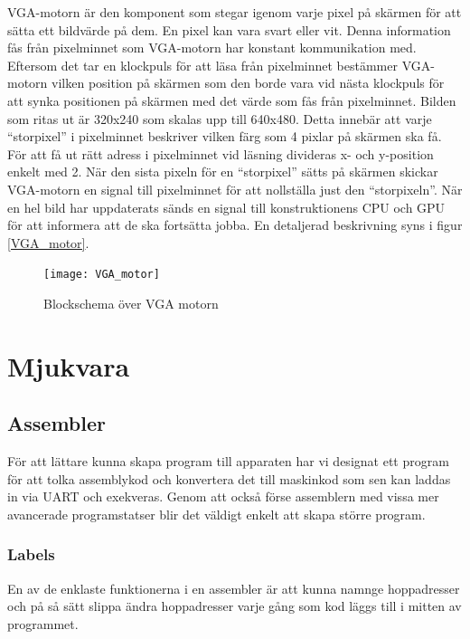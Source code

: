 \documentclass[a4paper]{article}
\begin{document}
    VGA-motorn är den komponent som stegar igenom varje pixel på skärmen för att
    sätta ett bildvärde på dem. En pixel kan vara svart eller vit. Denna
    information fås från pixelminnet som VGA-motorn har konstant kommunikation
    med. Eftersom det tar en klockpuls för att läsa från pixelminnet bestämmer
    VGA-motorn vilken position på skärmen som den borde vara vid nästa klockpuls
    för att synka positionen på skärmen med det värde som fås från pixelminnet.
    Bilden som ritas ut är 320x240 som skalas upp till 640x480. Detta innebär
    att varje “storpixel” i pixelminnet beskriver vilken färg som 4 pixlar på
    skärmen ska få. För att få ut rätt adress i pixelminnet vid läsning
    divideras x- och y-position enkelt med 2. När den sista pixeln för en
    “storpixel” sätts på skärmen skickar VGA-motorn en signal till pixelminnet
    för att nollställa just den “storpixeln”. När en hel bild har uppdaterats
    sänds en signal till konstruktionens CPU och GPU för att informera att de
    ska fortsätta jobba. En detaljerad beskrivning syns i figur \ref{VGA_motor}. 

    \begin{figure}[H]
        \centering
        \texttt{[image: VGA\_motor]}
        \caption{Blockschema över VGA motorn}
        \label{fig:VGA_motor}
    \end{figure}

    



    \section{Mjukvara}
    \subsection{Assembler}

    För att lättare kunna skapa program till apparaten har vi designat ett program
    för att tolka assemblykod och konvertera det till maskinkod som sen kan laddas
    in via UART och exekveras. Genom att också förse assemblern med vissa mer
    avancerade programstatser blir det väldigt enkelt att skapa större program. 

    \subsubsection{Labels}
    En av de enklaste funktionerna i en assembler är att kunna namnge hoppadresser
    och på så sätt slippa ändra hoppadresser varje gång som kod läggs till i mitten
    av programmet. 
\end{document}
